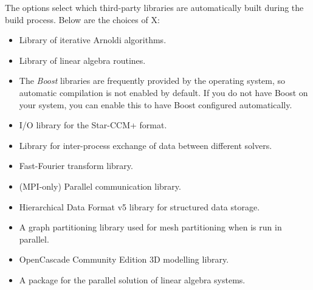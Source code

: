 The  options select which third-party libraries are
automatically built during the \nekpp build process. Below are the choices of X:
\begin{itemize}
    \item {}
    
    Library of iterative Arnoldi algorithms.
    
    \item {}
    
    Library of linear algebra routines.
    
    \item {}

    The \emph{Boost} libraries are frequently provided by the operating system,
    so automatic compilation is not enabled by default. If you do not have
    Boost on your system, you can enable this to have Boost configured
    automatically.

    \item {}
    
    I/O library for the Star-CCM+ format.
    
    \item {}
    
    Library for inter-process exchange of data between different solvers.
    
    \item {}
    
    Fast-Fourier transform library.
    
    \item {}

    (MPI-only) Parallel communication library.

    \item {}
    
    Hierarchical Data Format v5 library for structured data storage.
    
    \item {}

    A graph partitioning library used for mesh partitioning when \nekpp is run
    in parallel.

    \item {}
    
    OpenCascade Community Edition 3D modelling library.
    
    \item {}

    A package for the parallel solution of linear algebra systems.


\end{itemize}
